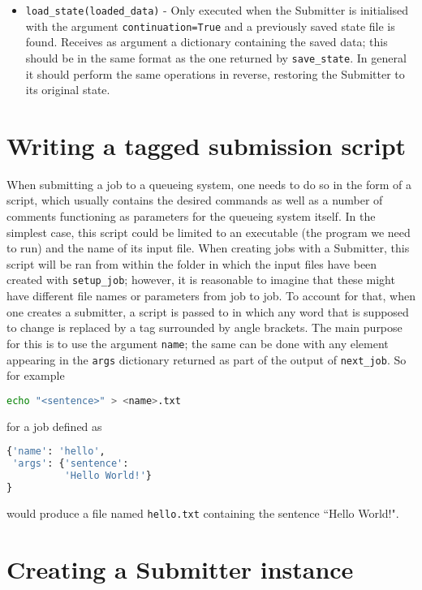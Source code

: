 \documentclass[]{report}
\begin{document}
\begin{itemize}
	\item \lstinline|load_state(loaded_data)| - Only executed when the Submitter is initialised with the argument \lstinline|continuation=True| and a previously saved state file is found. Receives as argument a dictionary containing the saved data; this should be in the same format as the one returned by \lstinline|save_state|. In general it should perform the same operations in reverse, restoring the Submitter to its original state.
\end{itemize}

\section{Writing a tagged submission script}

When submitting a job to a queueing system, one needs to do so in the form of a script, which usually contains the desired commands as well as a number of comments functioning as parameters for the queueing system itself. In the simplest case, this script could be limited to an executable (the program we need to run) and the name of its input file. When creating jobs with a Submitter, this script will be ran from within the folder in which the input files have been created with \lstinline|setup_job|; however, it is reasonable to imagine that these might have different file names or parameters from job to job. To account for that, when one creates a submitter, a script is passed to in which any word that is supposed to change is replaced by a tag surrounded by angle brackets. The main purpose for this is to use the argument \lstinline|name|; the same can be done with any element appearing in the \lstinline|args| dictionary returned as part of the output of \lstinline|next_job|. So for example

\begin{lstlisting}[language=bash]
echo "<sentence>" > <name>.txt
\end{lstlisting}

for a job defined as 

\begin{lstlisting}[language=python]
{'name': 'hello', 
 'args': {'sentence': 
          'Hello World!'}
}
\end{lstlisting}

would produce a file named \lstinline|hello.txt| containing the sentence ``Hello World!".

\section{Creating a Submitter instance}
\end{document}
